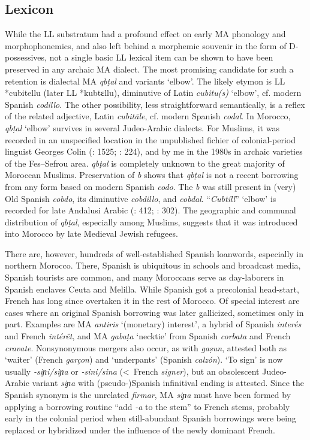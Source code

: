 \documentclass[output=paper]{langsci/langscibook}
\begin{document}
\subsection{Lexicon}

While the LL substratum had a profound effect on early MA phonology and morphophonemics, and also left behind a morphemic souvenir in the form of D-possessives, not a single basic LL lexical item can be shown to have been preserved in any archaic MA dialect. The most promising candidate for such a retention is dialectal MA \textit{qbṭal} and variants ‘elbow’. The likely etymon is LL *cubitellu (later LL *kubtɛllu), diminutive of Latin \textit{cubitu(s)} ‘elbow’, cf. modern Spanish \textit{codillo}. The other possibility, less straightforward semantically, is a reflex of the related adjective, Latin \textit{cubitāle}, cf. modern Spanish \textit{codal}. In Morocco, \textit{qbṭal} ‘elbow’ survives in several Judeo-Arabic dialects. For Muslims, it was recorded in an unspecified location in the unpublished fichier of colonial-period linguist Georges Colin (\citealt{IraquiSinaceur1993}: 1525; \citealt{Prémare1998}: 224), and by me in the 1980s in archaic varieties of the Fes--Sefrou area. \textit{qbṭal} is completely unknown to the great majority of Moroccan Muslims. Preservation of \textit{b} shows that \textit{qbṭal} is not a recent borrowing from any form based on modern Spanish \textit{codo}. The \textit{b} was still present in (very) Old Spanish \textit{cobdo}, its diminutive \textit{cobdillo}, and \textit{cobdal}. “\textit{Cubtíll}” ‘elbow’ is recorded for late Andalusi Arabic (\citealt{Corriente1997dictionary}: 412; \citealt{Dozy1967}: 302). The geographic and communal distribution of \textit{qbṭal}, especially among Muslims, suggests that it was introduced into Morocco by late Medieval Jewish refugees. 

There are, however, hundreds of well-established Spanish loanwords, especially in northern Morocco. There, Spanish is ubiquitous in schools and broadcast media, Spanish tourists are common, and many Moroccans serve as day-laborers in Spanish enclaves Ceuta and Melilla. While Spanish got a precolonial head-start, French has long since overtaken it in the rest of Morocco. Of special interest are cases where an original Spanish borrowing was later gallicized, sometimes only in part. Examples are MA \textit{antiris} ‘(monetary) interest’, a hybrid of Spanish \textit{interés} and French \textit{intérêt}, and MA \textit{g{\R}abaṭa} ‘necktie’ from Spanish \textit{corbata} and French \textit{cravate}. Nonsynonymous mergers also occur, as with \textit{ga{\R}ṣun}, attested both as ‘waiter’ (French \textit{garçon}) and ‘underpants’ (Spanish \textit{calzón}). ‘To sign’ is now usually \textit{\nobreakdash-siɲi/siɲa} or \textit{\nobreakdash-sini/sina} (<~French \textit{signer}), but an obsolescent Judeo-Arabic variant \textit{siɲa{\R}} with (pseudo-)Spanish infinitival ending is attested. Since the Spanish synonym is the unrelated \textit{firmar}, MA \textit{siɲa{\R}} must have been formed by applying a borrowing routine “add \textit{-a{\R}} to the stem” to French stems, probably early in the colonial period when still-abundant Spanish borrowings were being replaced or hybridized under the influence of the newly dominant French.
\end{document}
